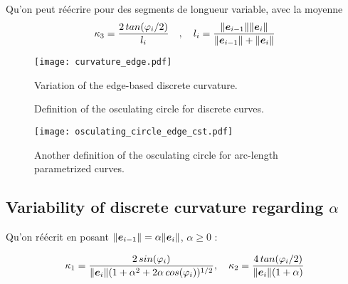 Qu'on peut réécrire pour des segments de longueur variable, avec la moyenne
\begin{equation}
	\kappa_3 = \frac{2 \,tan(\varphi_i/2)}{l_i}
	\quad , \quad 
	l_i = \frac{\|\boldsymbol{e}_{i-1} \| \|\boldsymbol{e}_{i} \|}{\|\boldsymbol{e}_{i-1}\| + \|\boldsymbol{e}_{i}\|}
\end{equation}


\begin{figure}[]
\begin{center}
\texttt{[image: curvature\_edge.pdf]}
\caption{Variation of the edge-based discrete curvature.}
\label{fig:1_1}
\end{center}
\end{figure}

\begin{figure}[h]
     \centering
     \caption{Definition of the osculating circle for discrete curves.}
     \label{steady_state}
\end{figure}

\begin{figure}[H]
\begin{center}
\texttt{[image: osculating\_circle\_edge\_cst.pdf]}
\caption{Another definition of the osculating circle for arc-length parametrized curves.}
\label{fig:1_1}
\end{center}
\end{figure}

\subsection{Variability of discrete curvature regarding $\alpha$}

Qu'on réécrit en posant $\|\boldsymbol{e}_{i-1}\| = \alpha \|\boldsymbol{e}_{i} \|$, $\alpha \geq 0$ :

\begin{equation}
	\kappa_1 = \frac{2 \,sin(\varphi_i)}{\|\boldsymbol{e}_{i}\|(1+ \alpha^2 + 2 \alpha \, cos(\varphi_i))^{1/2}},
	\quad
	\kappa_2 = \frac{4 \,tan(\varphi_i/2)}{\|\boldsymbol{e}_{i}\|(1+\alpha)}
\end{equation}

